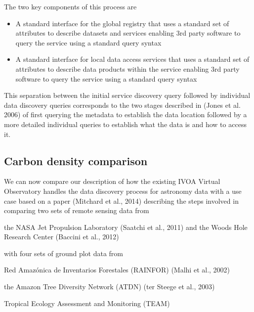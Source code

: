 \documentclass{article}
\begin{document}
The two key components of this process are
\begin{itemize}
  \item A standard interface for the global registry
that uses a standard set of attributes to describe datasets and services
enabling 3rd party software to query the service using a standard query syntax
  \item A standard interface for local data access services
that uses a standard set of attributes to describe data products within the service
enabling 3rd party software to query the service using a standard query syntax
\end{itemize}

This separation between the initial service discovery query
followed by individual data discovery queries
corresponds to the two stages described in (Jones et al. 2006)
of first querying the metadata to establish the data location
followed by a more detailed individual queries
to establish what the data is and how to access it. 

\subsection{Carbon density comparison}

We can now compare our description of how the existing IVOA Virtual Observatory
handles the data discovery process for astronomy data with a use case
based on a paper
(Mitchard et al., 2014)
describing the steps involved in comparing two sets of remote sensing data from

the NASA Jet Propulsion Laboratory
(Saatchi et al., 2011)
and the Woods Hole Research Center
(Baccini et al., 2012)

with four sets of ground plot data from

Red Amazónica de Inventarios Forestales (RAINFOR) (Malhi et al., 2002)

the
Amazon Tree Diversity Network (ATDN) (ter Steege et al., 2003)

Tropical Ecology Assessment and Monitoring (TEAM)
\end{document}
